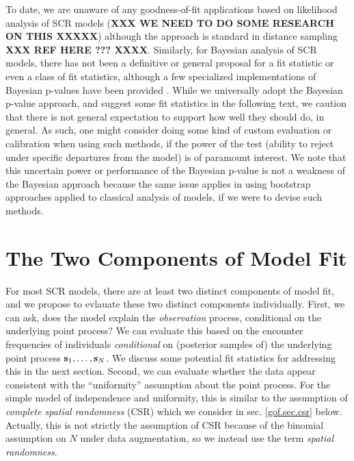 To date, we are unaware of any goodness-of-fit applications based on
likelihood analysis of SCR models ({\bf XXX WE NEED TO DO SOME
  RESEARCH ON THIS XXXXX}) although the approach is standard in
distance sampling {\bf XXX REF HERE ??? XXXX}.  Similarly, for Bayesian
analysis of SCR models, there has not been a definitive or general
proposal for a fit statistic or even a class of fit statistics,
although a few specialized implementations of Bayesian p-values have
been provided \citep{royle:2009,royle_etal:2011mee,
  gopalaswamy_etal:2012ecol,gopalaswamy_etal:2012mee,russell_etal:2012}.
While we universally adopt the Bayesian p-value approach, and suggest
some fit statistics in the following text, we caution that there is
not general expectation to support how well they should do, in
general. As such, one might consider doing some kind of custom
evaluation or calibration when using such methods, if the power of the
test (ability to reject under specific departures from the model) is
of paramount interest.  We note that this uncertain power or
performance of the Bayesian p-value is not a weakness of the Bayesian
approach because the same issue applies in using bootstrap approaches
applied to classical analysis of models, if we were to devise such
methods.




\section{The Two Components of Model Fit}

For most SCR models, there are at least two distinct components of
model fit, and we propose to evlauate these two distinct components 
 individually.  First, we can ask, does the model explain the {\it
  observation} process, conditional on the underlying point process?
We can evaluate this based on the encounter frequencies of individuals
{\it conditional} on (posterior samples of) the underlying point
process ${\bf s}_{1}, \ldots, {\bf s}_{N}$.  We discuss some potential
fit statistics for addressing this in the next section.  Second, we
can evaluate whether the data appear consistent with the
``uniformity'' assumption about the point process.  For the simple
model of independence and uniformity, this is similar to the
assumption of {\it complete spatial randomness} (CSR) which we
consider in sec. \ref{gof.sec.csr} below. Actually, this is not
strictly the assumption of CSR because of the binomial assumption on
$N$ under data augmentation, so we instead use the term {\it spatial
  randomness}.


